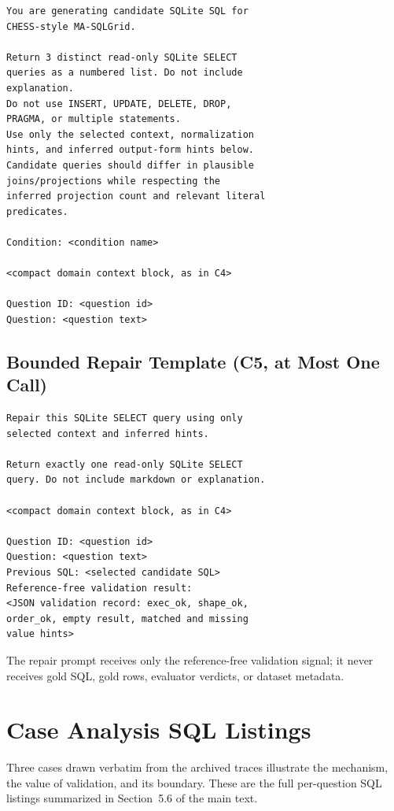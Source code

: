 \documentclass[11pt]{article}
\begin{document}
\begin{small}
\begin{verbatim}
You are generating candidate SQLite SQL for
CHESS-style MA-SQLGrid.

Return 3 distinct read-only SQLite SELECT
queries as a numbered list. Do not include
explanation.
Do not use INSERT, UPDATE, DELETE, DROP,
PRAGMA, or multiple statements.
Use only the selected context, normalization
hints, and inferred output-form hints below.
Candidate queries should differ in plausible
joins/projections while respecting the
inferred projection count and relevant literal
predicates.

Condition: <condition name>

<compact domain context block, as in C4>

Question ID: <question id>
Question: <question text>
\end{verbatim}
\end{small}

\subsection{Bounded Repair Template (C5, at Most One Call)}

\begin{small}
\begin{verbatim}
Repair this SQLite SELECT query using only
selected context and inferred hints.

Return exactly one read-only SQLite SELECT
query. Do not include markdown or explanation.

<compact domain context block, as in C4>

Question ID: <question id>
Question: <question text>
Previous SQL: <selected candidate SQL>
Reference-free validation result:
<JSON validation record: exec_ok, shape_ok,
order_ok, empty result, matched and missing
value hints>
\end{verbatim}
\end{small}

The repair prompt receives only the reference-free validation signal; it never receives gold SQL, gold rows, evaluator verdicts, or dataset metadata.

\section{Case Analysis SQL Listings}\label{sup:cases}

Three cases drawn verbatim from the archived traces illustrate the mechanism, the value of validation, and its boundary. These are the full per-question SQL listings summarized in Section~5.6 of the main text.
\end{document}
